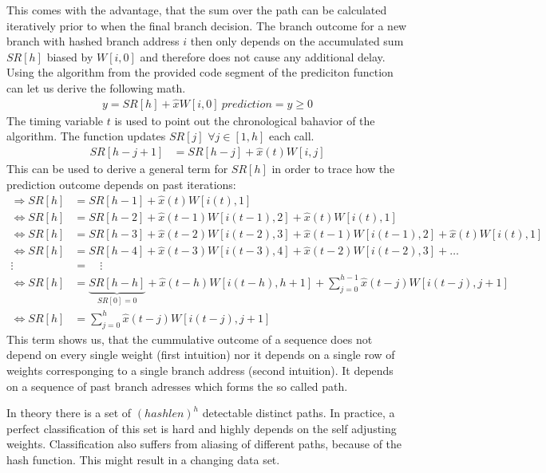 \documentclass{article}
\begin{document}
This comes with the advantage, that the sum over the path can be calculated iteratively prior to when the final branch decision. The branch outcome for a new branch with hashed branch address $i$ then only depends on the accumulated sum $SR[h]$ biased by $W[i,0]$ and therefore does not cause any additional delay. 
Using the algorithm from the provided code segment of the prediciton function can let us derive the following math.
\begin{align*}
	y = SR[h] + \hat{x} W[i,0] \
	\textit{prediction} = y\geq 0
\end{align*}
The timing variable $t$ is used to point out the chronological bahavior of the algorithm. The function updates $SR[j]$ $\forall j \in [1,h]$ each call.
\begin{align*}
	SR[h-j+1] &= SR[h-j] + \hat{x}(t) W[i,j] 
\end{align*}
This can be used to derive a general term for $SR[h]$ in order to trace how the prediction outcome depends on past iterations:
\begin{align*}
	\Rightarrow SR[h] &= SR[h-1] + \hat{x}(t) W[i(t),1] \\
	\iff SR[h] &= SR[h-2] + \hat{x}(t-1) W[i(t-1),2] + \hat{x}(t) W[i(t),1] \\
	\iff SR[h] &= SR[h-3] + \hat{x}(t-2) W[i(t-2),3] + \hat{x}(t-1) W[i(t-1),2] + \hat{x}(t) W[i(t),1] \\
	\iff SR[h] &= SR[h-4] + \hat{x}(t-3) W[i(t-3),4] + \hat{x}(t-2) W[i(t-2),3] + \dots \\%
	\vdots \quad &= \quad \vdots \\
	\iff SR[h] &= \underbrace{SR[h-h]}_{SR[0] = 0} + \hat{x}(t-h) W[i(t-h),h+1] + \sum_{j=0}^{h-1} \hat{x}(t-j) W[i(t-j),j+1] \\
	\iff SR[h] &=\sum_{j=0}^{h} \hat{x}(t-j) W[i(t-j),j+1] 
\end{align*}
This term shows us, that the cummulative outcome of a sequence does not depend on every single weight (first intuition) nor it depends on a single row of weights corresponging to a single branch address (second intuition). It depends on a sequence of past branch adresses which forms the so called path.

In theory there is a set of ${(hashlen)}^{h}$ detectable distinct paths. In practice, a perfect classification of this set is hard and highly depends on the self adjusting weights. Classification also suffers from aliasing of different paths, because of the hash function. This might result in a changing data set. 
\end{document}
